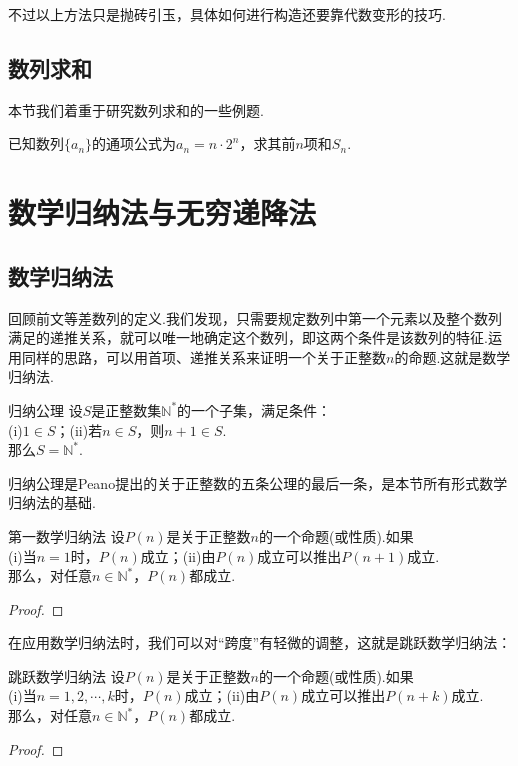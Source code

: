 \documentclass[lang=cn, zihao=5]{elegantbook}
\begin{document}
不过以上方法只是抛砖引玉，具体如何进行构造还要靠代数变形的技巧.

\subsection{数列求和}

本节我们着重于研究数列求和的一些例题.

\begin{example}
	已知数列$\{ a_n \}$的通项公式为$a_n=n \cdot 2^n$，求其前$n$项和$S_n$.
\end{example}

\section{数学归纳法与无穷递降法}

\subsection{数学归纳法}

回顾前文等差数列的定义.我们发现，只需要规定数列中第一个元素以及整个数列满足的递推关系，就可以唯一地确定这个数列，即这两个条件是该数列的特征.运用同样的思路，可以用首项、递推关系来证明一个关于正整数$n$的命题.这就是数学归纳法.

\begin{axiom}{归纳公理}
	设$S$是正整数集$\mathbb{N}^{*}$的一个子集，满足条件： \\
	(i)$1 \in S$；(ii)若$n \in S$，则$n+1 \in S$. \\
	那么$S = \mathbb{N}^{*}$.
\end{axiom}
\begin{remark}
	归纳公理是Peano提出的关于正整数的五条公理的最后一条，是本节所有形式数学归纳法的基础.
\end{remark}

\begin{theorem}{第一数学归纳法}
	设$P(n)$是关于正整数$n$的一个命题(或性质).如果 \\
	(i)当$n=1$时，$P(n)$成立；(ii)由$P(n)$成立可以推出$P(n+1)$成立. \\
	那么，对任意$n \in \mathbb{N}^{*}$，$P(n)$都成立.
\end{theorem}
\begin{proof}
\end{proof}

在应用数学归纳法时，我们可以对“跨度”有轻微的调整，这就是跳跃数学归纳法：

\begin{corollary}{跳跃数学归纳法}
	设$P(n)$是关于正整数$n$的一个命题(或性质).如果 \\
	(i)当$n=1,2, \cdots ,k$时，$P(n)$成立；(ii)由$P(n)$成立可以推出$P(n+k)$成立. \\
	那么，对任意$n \in \mathbb{N}^{*}$，$P(n)$都成立.
\end{corollary}
\begin{proof}
\end{proof}
\end{document}
